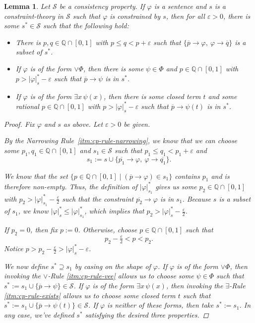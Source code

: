 \documentclass{amsart}
\newtheorem{lemma}[theorem]{Lemma}
\theoremstyle{definition}
\numberwithin{equation}{theorem}
\renewcommand{\phi}{\varphi}
\renewcommand{\epsilon}{\varepsilon}
\newcommand{\Q}{\mathbb{Q}}
\newcommand{\where}{\mid}
\newcommand{\unvee}{{\vee}}
\newcommand{\rat}[1]{{\overline{#1}}}
\newcommand{\narrow}[1]{\xrightarrow{#1}}
\renewcommand{\to}{\narrow{}}
\begin{document}
\begin{lemma}\label{lem:one-step}
  Let $\mathscr{S}$ be a consistency property.
  If $\phi$ is a sentence and $s$ is a constraint-theory in $\mathscr{S}$ such that $\phi$ is constrained by $s$, then for all $\epsilon>0$, there is some $s^*\in \mathscr{S}$ such that the following hold:
  \begin{itemize}
  \item 
    There is $p,q\in\Q\cap[0,1]$ with $p\leq q<p+\epsilon$ such that $\{\rat p\to\phi,\ \phi\to\rat q\}$ is a subset of $s^*$.
  \item 
    If $\phi$ is of the form $\unvee\Phi$, then there is some $\psi\in\Phi$ and $p\in\Q\cap[0,1]$ with $p>|\phi|^*_s-\epsilon$ such that $\rat p\to\psi$ is in $s^*$.
  \item 
    If $\phi$ is of the form $\exists x\,\psi(x)$, then there is some closed term $t$ and some rational $p\in\Q\cap[0,1]$ with $p>|\phi|^*_s-\epsilon$ such that $\rat p\to\psi(t)$ is in $s^*$.
  \end{itemize}
  \begin{proof}
    Fix $\phi$ and $s$ as above.
    Let $\epsilon>0$ be given.
    
    By the Narrowing Rule~\ref{itm:cp-rule-narrowing}, we know that we can choose some $p_1,q_1\in\Q\cap[0,1]$ and $s_1\in \mathscr{S}$ such that $p_1\leq q_1 <p_1+\epsilon$ and\[
      s_1:=s\cup\{\rat{p_1}\to\phi,\ \phi\to\rat{q_1}\}.
    \]
    
    We know that the set $\{p\in\Q\cap[0,1]\where(\rat p\to\phi)\in s_1\}$ contains $p_1$ and is therefore non-empty.
    Thus, the definition of $|\phi|^*_{s_1}$ gives us some $p_2\in\Q\cap[0,1]$ with $p_2>|\phi|^*_{s_1}-\tfrac\epsilon2$ such that the constraint $\rat{p_2}\to\phi$ is in $s_1$.
    Because $s$ is a subset of $s_1$, we know $|\phi|^*_s\leq|\phi|^*_{s_1}$, which implies that $p_2>|\phi|^*_s-\frac\epsilon2$.
    
    If $p_2=0$, then fix $p:=0$.
    Otherwise, choose $p\in\Q\cap[0,1]$ such that 
    \[
      p_2-\tfrac\epsilon2<p< p_2.
    \]
    Notice $p>p_2-\tfrac\epsilon2>|\phi|^*_s-\epsilon$.
    
    We now define $s^*\supseteq s_1$ by casing on the shape of $\phi$.
    If $\phi$ is of the form $\unvee\Phi$, then invoking the $\unvee$-Rule \ref{itm:cp-rule-vee} allows us to choose some $\psi\in\Phi$ such that $s^*:=s_1\cup\{\rat p\to\psi\}\in \mathscr{S}$.
    If $\phi$ is of the form $\exists x\,\psi(x)$, then invoking the $\exists$-Rule \ref{itm:cp-rule-exists} allows us to choose some closed term $t$ such that $s^*:=s_1\cup\{\rat p\to\psi(t)\}\in \mathscr{S}$.
    If $\phi$ is neither of these forms, then take $s^*:=s_1$.
    In any case, we've defined $s^*$ satisfying the desired three properties.
  \end{proof}
\end{lemma}
\end{document}
